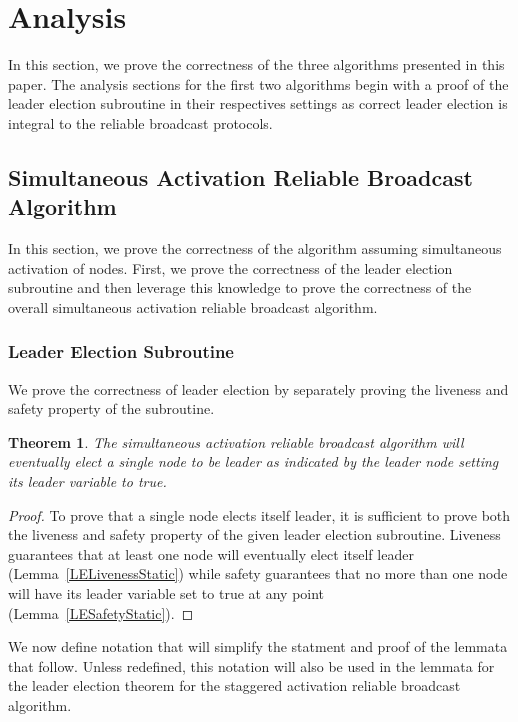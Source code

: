 \documentclass[english]{article}
\newtheorem{theorem}{Theorem}[section]
\begin{document}
\section{Analysis}

In this section, we prove the correctness of the three algorithms presented in this paper. The analysis sections for the first two algorithms begin with a proof of the leader election subroutine in their respectives settings as correct leader election is integral to the reliable broadcast protocols.

\subsection {Simultaneous Activation Reliable Broadcast Algorithm}

In this section, we prove the correctness of the algorithm assuming simultaneous activation of nodes. First, we prove the correctness of the leader election subroutine and then leverage this knowledge to prove the correctness of the overall simultaneous activation reliable broadcast algorithm.

\subsubsection{Leader Election Subroutine}

We prove the correctness of leader election by separately proving the liveness and safety property of the subroutine.

\begin{theorem}
\label{LeaderElectionStatic}
The simultaneous activation reliable broadcast algorithm will eventually elect a single node to be leader as indicated by the leader node setting its leader variable to true.
\end{theorem}
\begin{proof}
To prove that a single node elects itself leader, it is sufficient to prove both the liveness and safety property of the given leader election subroutine. Liveness guarantees that at least one node will eventually elect itself leader (Lemma~\ref{LELivenessStatic}) while safety guarantees that no more than one node will have its leader variable set to true at any point (Lemma~\ref{LESafetyStatic}).
\end{proof}

We now define notation that will simplify the statment and proof of the lemmata that follow. Unless redefined, this notation will also be used in the lemmata for the leader election theorem for the staggered activation reliable broadcast algorithm.
\end{document}
